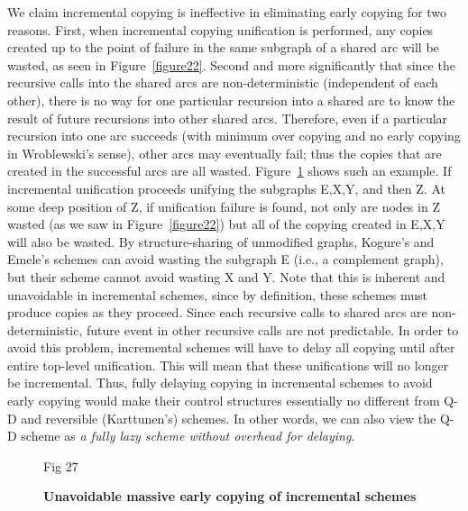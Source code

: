 We claim incremental copying is ineffective in eliminating early
copying for two reasons. First, when incremental copying unification
is performed, any copies created up to the point of failure in the
same subgraph of a shared arc will be wasted, as seen in Figure~\ref{figure22}.
Second and more significantly that since the recursive calls into the
shared arcs are non-deterministic (independent of each other), there
is no way for one particular recursion into a shared arc to know the
result of future recursions into other shared arcs. Therefore, even if
a particular recursion into one arc succeeds (with minimum over
copying and no early copying in Wroblewski's sense), other arcs may
eventually fail; thus the copies that are created in the successful
arcs are all wasted. Figure~\ref{figure23} shows such an example. If incremental
unification proceeds unifying the subgraphs E,X,Y, and then Z. At some
deep position of Z, if unification failure is found, not only are
nodes in Z wasted (as we saw in Figure~\ref{figure22}) but all of the copying
created in E,X,Y will also be wasted. By structure-sharing of
unmodified graphs, Kogure's and Emele's schemes can avoid wasting the
subgraph E (i.e., a complement graph), but their scheme cannot avoid
wasting X and Y.  Note that this is inherent and unavoidable in
incremental schemes, since by definition, these schemes must produce
copies as they proceed. Since each recursive calls to shared arcs are
non-deterministic, future event in other recursive calls are not
predictable. In order to avoid this problem, incremental schemes will
have to delay all copying until after entire top-level unification.
This will mean that these unifications will no longer be incremental.
Thus, fully delaying copying in incremental schemes to avoid early
copying would make their control structures essentially no different
from Q-D and reversible (Karttunen's) schemes.  In other words, we can
also view the Q-D scheme as {\it a fully lazy scheme without overhead for
delaying}.

\begin{figure}[htb]
\epsfxsize 140mm
\epsfysize 200mm
\vspace*{4.5cm}
\hspace*{5cm}
\vspace*{4cm}
\hspace*{12cm}      Fig 27
\vspace*{4cm}
\caption{{\bf Unavoidable massive early copying of incremental
schemes}}
\label{figure23}
\end{figure}


